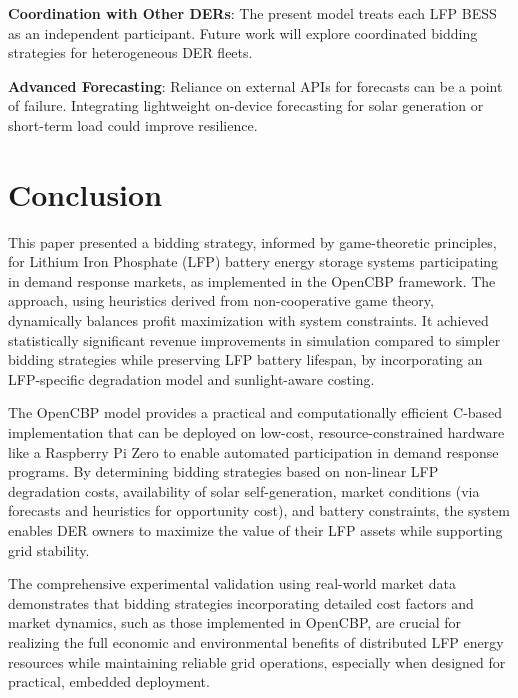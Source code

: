 \documentclass[11pt,a4paper]{article}
\begin{document}
\textbf{Coordination with Other DERs}: The present model treats each LFP BESS as an independent participant. Future work will explore coordinated bidding strategies for heterogeneous DER fleets.

\textbf{Advanced Forecasting}: Reliance on external APIs for forecasts can be a point of failure. Integrating lightweight on-device forecasting for solar generation or short-term load could improve resilience.

\section{Conclusion}
This paper presented a bidding strategy, informed by game-theoretic principles, for Lithium Iron Phosphate (LFP) battery energy storage systems participating in demand response markets, as implemented in the OpenCBP framework. The approach, using heuristics derived from non-cooperative game theory, dynamically balances profit maximization with system constraints. It achieved statistically significant revenue improvements in simulation compared to simpler bidding strategies while preserving LFP battery lifespan, by incorporating an LFP-specific degradation model and sunlight-aware costing.

The OpenCBP model provides a practical and computationally efficient C-based implementation that can be deployed on low-cost, resource-constrained hardware like a Raspberry Pi Zero to enable automated participation in demand response programs. By determining bidding strategies based on non-linear LFP degradation costs, availability of solar self-generation, market conditions (via forecasts and heuristics for opportunity cost), and battery constraints, the system enables DER owners to maximize the value of their LFP assets while supporting grid stability.

The comprehensive experimental validation using real-world market data demonstrates that bidding strategies incorporating detailed cost factors and market dynamics, such as those implemented in OpenCBP, are crucial for realizing the full economic and environmental benefits of distributed LFP energy resources while maintaining reliable grid operations, especially when designed for practical, embedded deployment.
\end{document}
